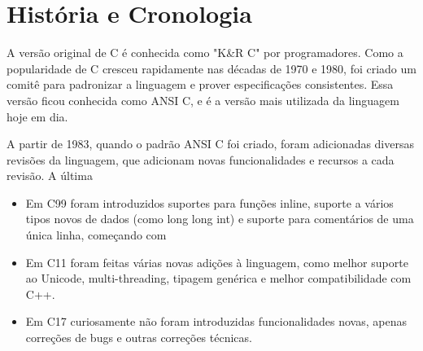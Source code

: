\chapter{História e Cronologia}

A versão original de C é conhecida como "K\&R C" por programadores.
Como a popularidade de C cresceu rapidamente nas décadas de 1970 e 1980,
foi criado um comitê para padronizar a linguagem e prover especificações 
consistentes. Essa versão ficou conhecida como ANSI C,
e é a versão mais utilizada da linguagem hoje em dia.

A partir de 1983, quando o padrão ANSI C foi criado, foram adicionadas 
diversas revisões da linguagem, que adicionam novas funcionalidades e recursos a cada revisão. A última 

\begin{itemize}
    \item Em C99 
    foram introduzidos suportes para funções inline, suporte a vários tipos novos de dados (como long long int)
    e suporte para comentários de uma única linha, começando com

    \item Em C11 foram feitas várias novas adições à linguagem, como melhor suporte ao Unicode, 
    multi-threading, tipagem genérica e melhor compatibilidade com C++.

    \item Em C17 curiosamente não foram introduzidas funcionalidades novas, apenas correções de bugs e outras correções técnicas.



\end{itemize}

\newpage